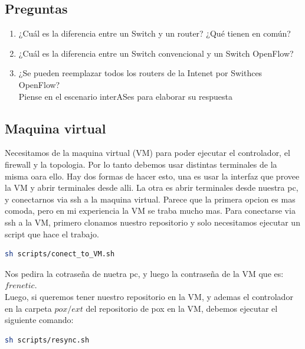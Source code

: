 \subsection{Preguntas}	
	\begin{enumerate}
		\item ¿Cuál es la diferencia entre un Switch y un router? ¿Qué tienen en común?
		\item ¿Cuál es la diferencia entre un Switch convencional y un Switch OpenFlow?
		\item ¿Se pueden reemplazar todos los routers de la Intenet por Swithces OpenFlow?\\
		Piense en el escenario interASes para elaborar su respuesta
	\end{enumerate}

\subsection{Maquina virtual}
	Necesitamos de la maquina virtual (VM) para poder ejecutar el controlador, el firewall y la topologia. Por lo tanto debemos usar 		distintas terminales de la misma oara ello. Hay dos formas de hacer esto, una es usar la interfaz que provee la VM y abrir terminales 		desde alli. La otra es abrir terminales desde nuestra pc, y conectarnos via ssh a la maquina virtual. Parece que la primera opcion es 		mas comoda, pero en mi experiencia la VM se traba mucho mas.
	Para conectarse via ssh a la VM, primero clonamos nuestro repositorio y solo necesitamos ejecutar un script que hace el trabajo.
	\begin{lstlisting}[language=bash]
		sh scripts/conect_to_VM.sh
	\end{lstlisting}
	Nos pedira la cotraseña de nuetra pc, y luego la contraseña de la VM que es: $frenetic$.\\
	Luego, si queremos tener nuestro repositorio en la VM, y ademas el controlador en la carpeta $pox/ext$ del repositorio de pox en la VM, 	debemos ejecutar el siguiente comando:\\
	\begin{lstlisting}[language=bash]
		sh scripts/resync.sh
	\end{lstlisting}
